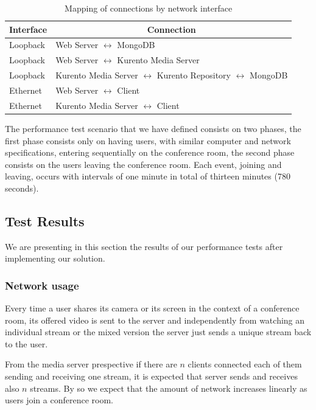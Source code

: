   \begin{table}[!htb]
\centering
\caption{Mapping of connections by network interface}
\label{table:interfacemap}
\begin{tabular}{|l|l|}
\hline
\multicolumn{1}{|c|}{\textbf{Interface}} & \multicolumn{1}{c|}{\textbf{Connection}}         \\ \hline
Loopback & Web Server $\leftrightarrow$ MongoDB  \\ \hline
Loopback & Web Server $\leftrightarrow$ Kurento Media Server  \\ \hline
Loopback & Kurento Media Server $\leftrightarrow$ Kurento Repository $\leftrightarrow$ MongoDB  \\ \hline
Ethernet & Web Server $\leftrightarrow$ Client\\ \hline
Ethernet & Kurento Media Server $\leftrightarrow$ Client\\ \hline
\end{tabular}
\end{table}


      The performance test scenario that we have defined consists on two phases, the first phase consists only on having users, with similar computer and network specifications, entering sequentially on the conference room, the second phase consists on the users leaving the conference room. Each event, joining and leaving, occurs with intervals of one minute in total of thirteen minutes (780 seconds).

  


\subsection{Test Results}
  
      We are presenting in this section the results of our performance tests after implementing our solution.
\subsubsection{Network usage}

      Every time a user shares its camera or its screen in the context of a conference room, its offered video is sent to the server and independently from watching an individual stream or the mixed version the server just sends a unique stream back to the user.

      From the media server prespective if there are $n$ clients connected each of them sending and receiving one stream, it is expected that server sends and receives also $n$ streams. By so we expect that the amount of network increases linearly as users join a conference room.

